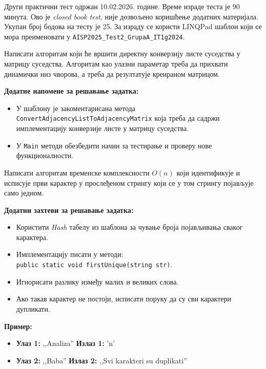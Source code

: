 
Други практични тест одржан 10.02.2026. године. Време израде теста је 90 минута. Ово је \textit{closed book test}, није дозвољено коришћење додатних материјала. Укупан број бодова на тесту је 25. За израду се користи LINQPad шаблон који се мора преименовати у \texttt{AISP2025\_Test2\_GrupaA\_IT1g2024}.

Написати алгоритам који ће вршити директну конверзију листе суседства у матрицу суседства. Алгоритам као улазни параметар треба да прихвати динамички низ чворова, а треба да резултатује креираном матрицом.

\textbf{Додатне напомене за решавање задатка:}
\begin{itemize}
    \item У шаблону је закоментарисана метода \texttt{ConvertAdjacencyListToAdjacencyMatrix} која треба да садржи имплементацију конверзије листе у матрицу суседства.
    \item У \texttt{Main} методи обезбедити начин за тестирање и проверу нове функционалности.
\end{itemize}

Написати алгоритам временске комплексности $O(n)$ који идентификује и исписује први карактер у прослеђеном стрингу који се у том стрингу појављује само једном.

 \textbf{Додатни захтеви за решавање задатка:}
\begin{itemize}
    \item Користити \textit{Hash} табелу из шаблона за чување броја појављивања сваког карактера.
    \item Имплементацију писати у методи: \\ \texttt{public static void firstUnique(string str)}.
    \item Игнорисати разлику између малих и великих слова.
    \item Ако такав карактер не постоји, исписати поруку да су сви карактери дупликати.
\end{itemize}

\textbf{Пример:}
\begin{itemize}
    \item \textbf{Улаз 1:} ,,Analiza''  \quad\textbf{Излаз 1:} 'n' 
    \item \textbf{Улаз 2:} ,,Baba'' \quad\textbf{Излаз 2:} ,,Svi karakteri su duplikati''
\end{itemize}

